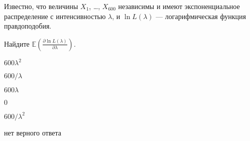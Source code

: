 
\begin{question}
Известно, что величины \(X_1\), \ldots, \(X_{600}\) независимы и имеют
экспоненциальное распределение с интенсивностью \(\lambda\), и
\(\ln L(\lambda)\) --- логарифмическая функция правдоподобия.

Найдите
\(\mathbb{E}\left(\frac{\partial \ln L(\lambda)}{\partial\lambda} \right)\).
\begin{answerlist}
  \item \(600\lambda^2\)
  \item \(600/\lambda\)
  \item \(600\lambda\)
  \item \(0\)
  \item \(600/\lambda^2\)
  \item нет верного ответа
\end{answerlist}
\end{question}


